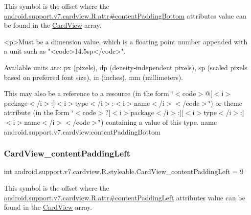 This symbol is the offset where the \hyperlink{classandroid_1_1support_1_1v7_1_1cardview_1_1R_1_1attr_a49d455b8fac184949496acb1dc210bf9}{android.\+support.\+v7.\+cardview.\+R.\+attr\#content\+Padding\+Bottom} attribute\textquotesingle{}s value can be found in the \hyperlink{classandroid_1_1support_1_1v7_1_1cardview_1_1R_1_1styleable_ad08b98a07471f174f404c58941fc82ca}{Card\+View} array.

\begin{DoxyVerb}      <p>Must be a dimension value, which is a floating point number appended with a unit such as "<code>14.5sp</code>".
\end{DoxyVerb}
 Available units are\+: px (pixels), dp (density-\/independent pixels), sp (scaled pixels based on preferred font size), in (inches), mm (millimeters). 

This may also be a reference to a resource (in the form \char`\"{}$<$code$>$@\mbox{[}$<$i$>$package$<$/i$>$\+:\mbox{]}$<$i$>$type$<$/i$>$\+:$<$i$>$name$<$/i$>$$<$/code$>$\char`\"{}) or theme attribute (in the form \char`\"{}$<$code$>$?\mbox{[}$<$i$>$package$<$/i$>$\+:\mbox{]}\mbox{[}$<$i$>$type$<$/i$>$\+:\mbox{]}$<$i$>$name$<$/i$>$$<$/code$>$\char`\"{}) containing a value of this type.  name android.\+support.\+v7.\+cardview\+:content\+Padding\+Bottom \mbox{\label{classandroid_1_1support_1_1v7_1_1cardview_1_1R_1_1styleable_aaad29bef85433a8e7f930c1f2c8491f0}} 
\subsubsection{\texorpdfstring{Card\+View\+\_\+content\+Padding\+Left}{CardView\_contentPaddingLeft}}
{\footnotesize\ttfamily int android.\+support.\+v7.\+cardview.\+R.\+styleable.\+Card\+View\+\_\+content\+Padding\+Left = 9\hspace{0.3cm}{\ttfamily [static]}}

This symbol is the offset where the \hyperlink{classandroid_1_1support_1_1v7_1_1cardview_1_1R_1_1attr_a3a740be3cc8e533e2464bdbc5541f153}{android.\+support.\+v7.\+cardview.\+R.\+attr\#content\+Padding\+Left} attribute\textquotesingle{}s value can be found in the \hyperlink{classandroid_1_1support_1_1v7_1_1cardview_1_1R_1_1styleable_ad08b98a07471f174f404c58941fc82ca}{Card\+View} array.


